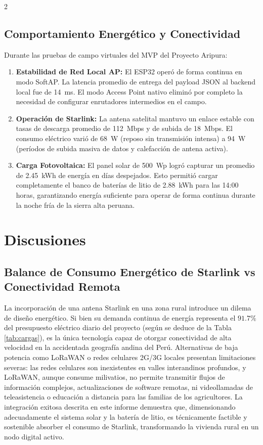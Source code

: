 \documentclass[a4paper, 11pt]{article}
\begin{document}
\begin{multicols}{2}
\subsection{Comportamiento Energético y Conectividad}
Durante las pruebas de campo virtuales del MVP del Proyecto Aripura:
\begin{enumerate}
    \item \textbf{Estabilidad de Red Local AP:} El ESP32 operó de forma continua en modo SoftAP. La latencia promedio de entrega del payload JSON al backend local fue de \SI{14}{ms}. El modo Access Point nativo eliminó por completo la necesidad de configurar enrutadores intermedios en el campo.
    \item \textbf{Operación de Starlink:} La antena satelital mantuvo un enlace estable con tasas de descarga promedio de \SI{112}{Mbps} y de subida de \SI{18}{Mbps}. El consumo eléctrico varió de \SI{68}{W} (reposo sin transmisión intensa) a \SI{94}{W} (períodos de subida masiva de datos y calefacción de antena activa).
    \item \textbf{Carga Fotovoltaica:} El panel solar de \SI{500}{Wp} logró capturar un promedio de \SI{2.45}{kWh} de energía en días despejados. Esto permitió cargar completamente el banco de baterías de litio de \SI{2.88}{kWh} para las \num{14}:00 horas, garantizando energía suficiente para operar de forma continua durante la noche fría de la sierra alta peruana.
\end{enumerate}

\section{Discusiones}

\subsection{Balance de Consumo Energético de Starlink vs Conectividad Remota}
La incorporación de una antena Starlink en una zona rural introduce un dilema de diseño energético. Si bien su demanda continua de energía representa el $91.7\%$ del presupuesto eléctrico diario del proyecto (según se deduce de la Tabla \ref{tab:cargas}), es la única tecnología capaz de otorgar conectividad de alta velocidad en la accidentada geografía andina del Perú. Alternativas de baja potencia como LoRaWAN o redes celulares 2G/3G locales presentan limitaciones severas: las redes celulares son inexistentes en valles interandinos profundos, y LoRaWAN, aunque consume milivatios, no permite transmitir flujos de información complejos, actualizaciones de software remotas, ni videollamadas de teleasistencia o educación a distancia para las familias de los agricultores. La integración exitosa descrita en este informe demuestra que, dimensionando adecuadamente el sistema solar y la batería de litio, es técnicamente factible y sostenible absorber el consumo de Starlink, transformando la vivienda rural en un nodo digital activo.


\end{multicols}
\end{document}
